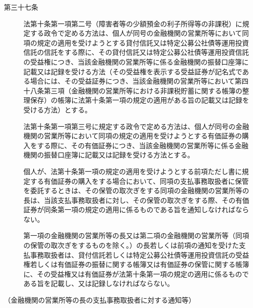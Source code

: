 \documentclass[twocolumn,a4j,10pt]{ltjtarticle}
\begin{document}
\begin{description}
\item[第三十七条]法第十条第一項第二号（障害者等の少額預金の利子所得等の非課税）に規定する政令で定める方法は、個人が同号の金融機関の営業所等において同項の規定の適用を受けようとする貸付信託又は特定公募公社債等運用投資信託の信託をする際に、その貸付信託又は特定公募公社債等運用投資信託の受益権につき、当該金融機関の営業所等に係る金融機関の振替口座簿に記載又は記録を受ける方法（その受益権を表示する受益証券が記名式である場合には、その受益証券につき、当該金融機関の営業所等において第四十八条第三項（金融機関の営業所等における非課税貯蓄に関する帳簿の整理保存）の帳簿に法第十条第一項の規定の適用がある旨の記載又は記録を受ける方法）とする。
\item[]法第十条第一項第三号に規定する政令で定める方法は、個人が同号の金融機関の営業所等において同項の規定の適用を受けようとする有価証券の購入をする際に、その有価証券につき、当該金融機関の営業所等に係る金融機関の振替口座簿に記載又は記録を受ける方法とする。
\item[]個人が、法第十条第一項の規定の適用を受けようとする前項ただし書に規定する有価証券の購入をする場合において、同項の支払事務取扱者に保管を委託するときは、その保管の取次ぎをする同項の金融機関の営業所等の長は、当該支払事務取扱者に対し、その保管の取次ぎをする際、その有価証券が同条第一項の規定の適用に係るものである旨を通知しなければならない。
\item[]第一項の金融機関の営業所等の長又は第二項の金融機関の営業所等（同項の保管の取次ぎをするものを除く。）の長若しくは前項の通知を受けた支払事務取扱者は、貸付信託若しくは特定公募公社債等運用投資信託の受益権若しくは有価証券の振替に関する帳簿又は有価証券の保管に関する帳簿に、その受益権又は有価証券が法第十条第一項の規定の適用に係るものである旨を記載し、又は記録しなければならない。
\end{description}
\noindent\hspace{10pt}（金融機関の営業所等の長の支払事務取扱者に対する通知等）
\end{document}

